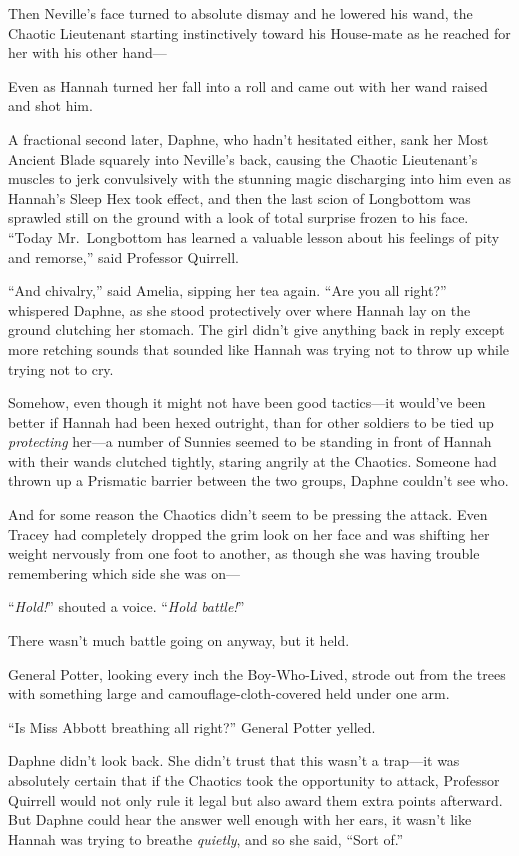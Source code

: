 Then Neville’s face turned to absolute dismay and he lowered his
wand, the Chaotic Lieutenant starting instinctively toward his
House-mate as he reached for her with his other hand—

Even as Hannah turned her fall into a roll and came out with her
wand raised and shot him.

A fractional second later, Daphne, who hadn’t hesitated either,
sank her Most Ancient Blade squarely into Neville’s back, causing
the Chaotic Lieutenant’s muscles to jerk convulsively with the
stunning magic discharging into him even as Hannah’s Sleep Hex took
effect, and then the last scion of Longbottom was sprawled still on
the ground with a look of total surprise frozen to his face.
\sbreak
“Today Mr.~Longbottom has learned a valuable lesson about his
feelings of pity and remorse,” said Professor Quirrell.

“And chivalry,” said Amelia, sipping her tea again.
\sbreak
“Are you all right?” whispered Daphne, as she stood protectively
over where Hannah lay on the ground clutching her stomach. The girl
didn’t give anything back in reply except more retching sounds that
sounded like Hannah was trying not to throw up while trying not to
cry.

Somehow, even though it might not have been good tactics—it
would’ve been better if Hannah had been hexed outright, than for
other soldiers to be tied up \emph{protecting} her—a number of
Sunnies seemed to be standing in front of Hannah with their wands
clutched tightly, staring angrily at the Chaotics. Someone had
thrown up a Prismatic barrier between the two groups, Daphne
couldn’t see who.

And for some reason the Chaotics didn’t seem to be pressing the
attack. Even Tracey had completely dropped the grim look on her
face and was shifting her weight nervously from one foot to
another, as though she was having trouble remembering which side
she was on—

“\emph{Hold!}” shouted a voice. “\emph{Hold battle!}”

There wasn’t much battle going on anyway, but it held.

General Potter, looking every inch the Boy-Who-Lived, strode out
from the trees with something large and camouflage-cloth-covered
held under one arm.

“Is Miss Abbott breathing all right?” General Potter yelled.

Daphne didn’t look back. She didn’t trust that this wasn’t a
trap—it was absolutely certain that if the Chaotics took the
opportunity to attack, Professor Quirrell would not only rule it
legal but also award them extra points afterward. But Daphne could
hear the answer well enough with her ears, it wasn’t like Hannah
was trying to breathe \emph{quietly}, and so she said, “Sort
of.”

